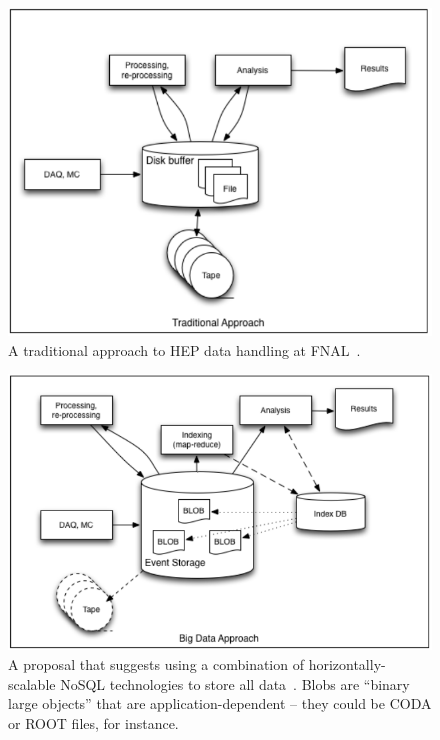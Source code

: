 \begin{figure}
	\centering
	\includegraphics[height=0.42\textheight]{figures/production/traditional-data.png}
	\caption{A traditional approach to HEP data handling at FNAL~\cite{igor:bigdata}.}
	\label{fig:traditional-data}
\end{figure}
\begin{figure}
	\centering
	\includegraphics[height=0.355\textheight]{figures/production/new-proposal.png}
	\caption{A proposal that suggests using a combination of horizontally-scalable NoSQL technologies to store all data~\cite{igor:bigdata}. Blobs are ``binary large objects'' that are application-dependent -- they could be CODA or ROOT files, for instance.}
	\label{fig:big-data}
\end{figure}

